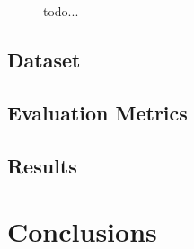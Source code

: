 \documentclass[10pt,letterpaper]{article}
\begin{document}
\begin{figure}[h]
     \begin{center}
          \end{center}
    \caption{todo... 
     }
   \label{fig:main}
\end{figure}

\subsection{Dataset}

\subsection{Evaluation Metrics}
\subsection{Results}

\section{Conclusions}



\setlength{\bibleftmargin}{.125in}
\setlength{\bibindent}{-\bibleftmargin}


\end{document}

